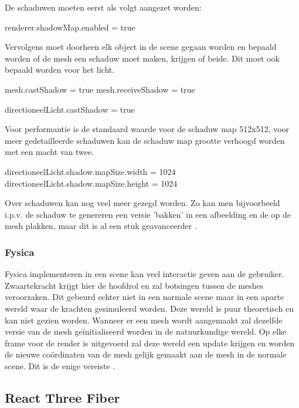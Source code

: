 De schaduwen moeten eerst als volgt aangezet worden:

\begin{LVerbatim}
renderer.shadowMap.enabled = true
\end{LVerbatim}

Vervolgens moet doorheen elk object in de scene gegaan worden en bepaald worden of de mesh een schaduw moet maken, krijgen of beide. Dit moet ook bepaald worden voor het licht.

\begin{LVerbatim}
mesh.castShadow = true
mesh.receiveShadow = true

directioneelLicht.castShadow = true
\end{LVerbatim}

Voor performantie is de standaard waarde voor de schaduw map 512x512, voor meer gedetailleerde schaduwen kan de schaduw map grootte verhoogd worden met een macht van twee.

\begin{LVerbatim}
directioneelLicht.shadow.mapSize.width = 1024
directioneelLicht.shadow.mapSize.height = 1024
\end{LVerbatim}

Over schaduwen kan nog veel meer gezegd worden. Zo kan men bijvoorbeeld i.p.v. de schaduw te genereren een versie 'bakken' in een afbeelding en de op de mesh plakken, maar dit is al een stuk geavanceerder \autocite{Simon2023}.

\subsubsection{Fysica}

Fysica implementeren in een scene kan veel interactie geven aan de gebruiker. Zwaartekracht krijgt hier de hoofdrol en zal botsingen tussen de meshes veroorzaken. Dit gebeurd echter niet in een normale scene maar in een aparte wereld waar de krachten gesimuleerd worden. Deze wereld is puur theoretisch en kan niet gezien worden. Wanneer er een mesh wordt aangemaakt zal dezelfde versie van de mesh geïnitialiseerd worden in de natuurkundige wereld.
Op elke frame voor de render is uitgevoerd zal deze wereld een update krijgen en worden de nieuwe coördinaten van de mesh gelijk gemaakt aan de mesh in de normale scene. Dit is de enige vereiste \autocite{Simon2023}.

\subsection{React Three Fiber}

